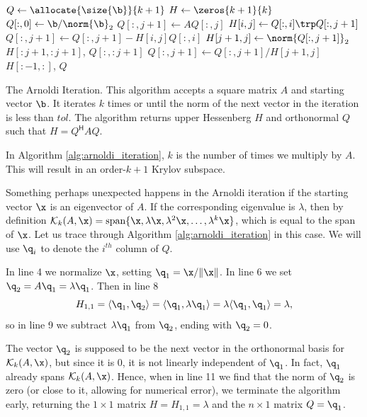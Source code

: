 \begin{algorithm}
\begin{algorithmic}[1]
	\State $Q \gets \allocate{\size{\b}}{k+1}$			
	\State $H \gets \zeros{ k+1}{ k}$
	\State $Q[:,0] \gets \b/\norm{\b}_2$
								
		\State $Q[:,j+1] \gets AQ[:,j]$
							
			\State $H[i,j] \gets Q[:,i]\trp Q[:,j+1]$
			\State $Q[:,j+1] \gets Q[:,j+1] - H[i,j] Q[:,i]$
		\EndFor
		\State $H[j+1,j] \gets \norm{Q[:,j+1]}_2$			
            					
			\State {} $H[:j+1,:j+1]$, $Q[:,:j+1]$
		\EndIf
		\State $Q[:,j+1] \gets Q[:,j+1]/H[j+1,j]$				
	\EndFor
	\State {} $H[:-1, :]$, $Q$			
\EndProcedure
\end{algorithmic}
\caption{The Arnoldi Iteration. This algorithm accepts a square matrix $A$ and starting vector $\b$. It iterates $k$ times or until the norm of the next vector in the iteration is less than $tol$.
The algorithm returns upper Hessenberg $H$ and orthonormal $Q$ such that $H = Q^{\mathsf{H}}AQ$.}
\label{alg:arnoldi_iteration}
\end{algorithm}

In Algorithm \ref{alg:arnoldi_iteration}, $k$ is the number of times we multiply by $A$.
This will result in an order-$k+1$ Krylov subspace.

Something perhaps unexpected happens in the Arnoldi iteration if the starting vector $\x$ is an eigenvector of $A$.
If the corresponding eigenvalue is $\lambda$, then by definition $\mathcal{K}_k(A, \x)=\text{span}\{\x, \lambda \x, \lambda^2\x, \ldots, \lambda^k \x\}$, which is equal to the span of $\x$.
Let us trace through Algorithm \ref{alg:arnoldi_iteration} in this case. We will use $\q_i$ to denote the $i^{th}$ column of $Q$.

In line 4 we normalize $\x$, setting $\q_1 = \x/\|\x\|$.
In line 6 we set $\q_2 = A\q_1 = \lambda \q_1$.
Then in line 8
\[
H_{1,1} = \langle \q_1, \q_2 \rangle = \langle \q_1, \lambda \q_1 \rangle = \lambda \langle \q_1, \q_1 \rangle = \lambda,
\]
so in line 9 we subtract $\lambda \q_1$ from $\q_2$, ending with $\q_2=0$.

The vector $\q_2$ is supposed to be the next vector in the orthonormal basis for $\mathcal{K}_k(A, \x)$, but since it is 0, it is not linearly independent of $\q_1$. In fact, $\q_1$ already spans $\mathcal{K}_k(A, \x)$.
Hence, when in line 11 we find that the norm of $\q_2$ is zero (or close to it, allowing for numerical error), we terminate the algorithm early, returning the $1\times 1$ matrix $H = H_{1, 1}=\lambda$ and the $n\times 1$ matrix $Q = \q_1$.


